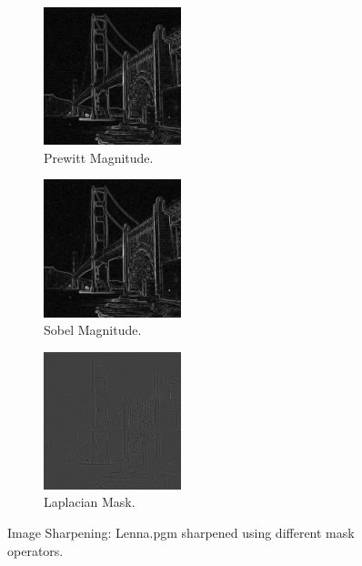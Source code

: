 \documentclass[letterpaper,10pt]{article}
\begin{document}
  \begin{figure}[hbtp]
    \centering
    \begin{subfigure}{4cm}
      \includegraphics[width=4cm]{images/prewitt_sf.png}
      \caption{Prewitt Magnitude.}
    \end{subfigure}
    \begin{subfigure}{4cm}
      \includegraphics[width=4cm]{images/sobel_sf.png}
      \caption{Sobel Magnitude.}
    \end{subfigure}
    \begin{subfigure}{4cm}
      \includegraphics[width=4cm]{images/laplacian_sf.png}
      \caption{Laplacian Mask.}
    \end{subfigure}
    \caption{Image Sharpening: Lenna.pgm sharpened using different mask operators.}
    \label{fig:sharpensf}
  \end{figure}
\end{document}
